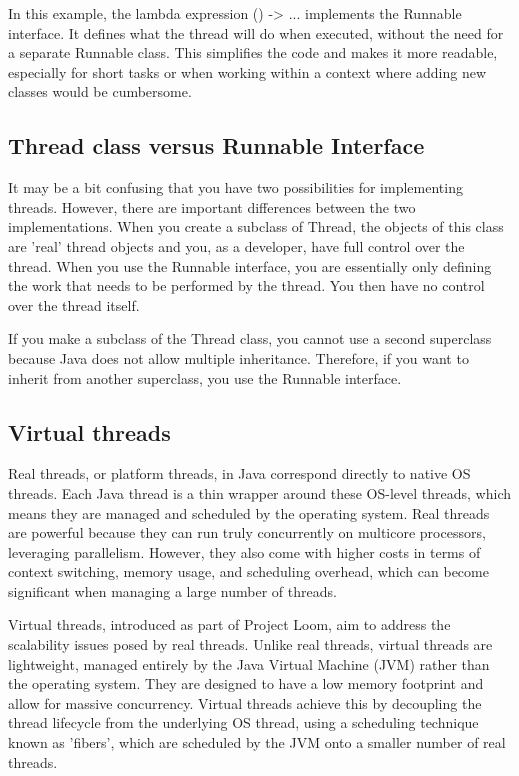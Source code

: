 In this example, the lambda expression () -> {...} implements the Runnable interface. It defines what the thread will do when executed, without the need for a separate Runnable class. This simplifies the code and makes it more readable, especially for short tasks or when working within a context where adding new classes would be cumbersome.


\subsection{Thread class versus Runnable Interface}

It may be a bit confusing that you have two possibilities for implementing threads. However, there are important differences between the two implementations. When you create a subclass of Thread, the objects of this class are 'real' thread objects and you, as a developer, have full control over the thread. When you use the Runnable interface, you are essentially only defining the work that needs to be performed by the thread. You then have no control over the thread itself.

If you make a subclass of the Thread class, you cannot use a second superclass because Java does not allow multiple inheritance. Therefore, if you want to inherit from another superclass, you use the Runnable interface.

\subsection{Virtual threads}

Real threads, or platform threads, in Java correspond directly to native OS threads. Each Java thread is a thin wrapper around these OS-level threads, which means they are managed and scheduled by the operating system. Real threads are powerful because they can run truly concurrently on multicore processors, leveraging parallelism. However, they also come with higher costs in terms of context switching, memory usage, and scheduling overhead, which can become significant when managing a large number of threads.

Virtual threads, introduced as part of Project Loom, aim to address the scalability issues posed by real threads. Unlike real threads, virtual threads are lightweight, managed entirely by the Java Virtual Machine (JVM) rather than the operating system. They are designed to have a low memory footprint and allow for massive concurrency. Virtual threads achieve this by decoupling the thread lifecycle from the underlying OS thread, using a scheduling technique known as 'fibers', which are scheduled by the JVM onto a smaller number of real threads.

